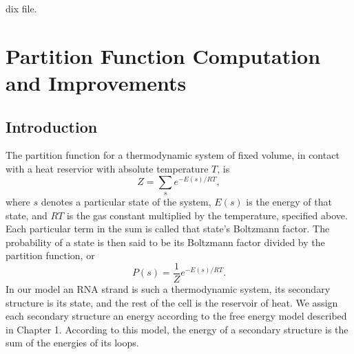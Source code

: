dix file.
\chapter{Partition Function Computation and Improvements}
\section{Introduction}

The partition function for a thermodynamic system of fixed volume, in
contact with a heat reservior with absolute temperature $T$, is
\begin{equation} Z = \sum_s e^{-E(s)/ RT }, \end{equation}
where $s$ denotes a particular state of the system, $E(s)$ is the
energy of that state, and $RT$ is the gas constant multiplied by the
temperature, specified above. Each particular term in the sum is
called that state's Boltzmann factor. The probability of a state is
then said to be its Boltzmann factor divided by the partition
function, or
\begin{equation} P(s) = \frac{1}{Z}e^{-E(s)/RT}.  \end{equation}
In our model an RNA strand is such a thermodynamic system, its
secondary structure is its state, and the rest of the cell is the
reservoir of heat. We assign each secondary structure an energy
according to the free energy model described in Chapter 1. According
to this model, the energy of a secondary structure is the sum of the
energies of its loops. 


